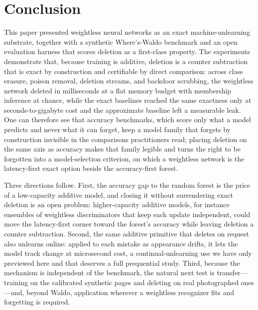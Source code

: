 \section{Conclusion}
\label{sec:conclusion}

This paper presented weightless neural networks as an exact machine-unlearning substrate, together with a synthetic Where's-Waldo benchmark and an open evaluation harness that scores deletion as a first-class property. The experiments demonstrate that, because training is additive, deletion is a counter subtraction that is exact by construction and certifiable by direct comparison: across class erasure, poison removal, deletion streams, and backdoor scrubbing, the weightless network deleted in milliseconds at a flat memory budget with membership inference at chance, while the exact baselines reached the same exactness only at seconds-to-gigabyte cost and the approximate baseline left a measurable leak. One can therefore see that accuracy benchmarks, which score only what a model predicts and never what it can forget, keep a model family that forgets by construction invisible in the comparisons practitioners read; placing deletion on the same axis as accuracy makes that family legible and turns the right to be forgotten into a model-selection criterion, on which a weightless network is the latency-first exact option beside the accuracy-first forest.

Three directions follow. First, the accuracy gap to the random forest is the price of a low-capacity additive model, and closing it without surrendering exact deletion is an open problem: higher-capacity additive models, for instance ensembles of weightless discriminators that keep each update independent, could move the latency-first corner toward the forest's accuracy while leaving deletion a counter subtraction. Second, the same additive primitive that deletes on request also unlearns online: applied to each mistake as appearance drifts, it lets the model track change at microsecond cost, a continual-unlearning use we have only previewed here and that deserves a full prequential study. Third, because the mechanism is independent of the benchmark, the natural next test is transfer---training on the calibrated synthetic pages and deleting on real photographed ones---and, beyond Waldo, application wherever a weightless recognizer fits and forgetting is required.

